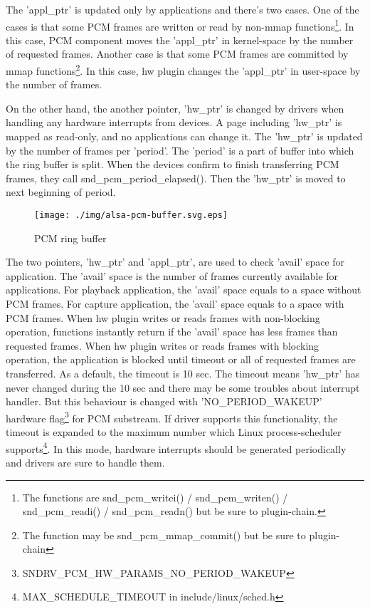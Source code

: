 \documentclass[onecolumn]{article}
\begin{document}
The 'appl\_ptr' is updated only by applications and there's two cases. One of the cases is that some PCM frames are written or read by non-mmap functions\footnote{The functions are snd\_pcm\_writei() / snd\_pcm\_writen() / snd\_pcm\_readi() / snd\_pcm\_readn() but be sure to plugin-chain.}. In this case, PCM component moves the 'appl\_ptr' in kernel-space by the number of requested frames. Another case is that some PCM frames are committed by mmap functions\footnote{The function may be snd\_pcm\_mmap\_commit() but be sure to plugin-chain}. In this case, hw plugin changes the 'appl\_ptr' in user-space by the number of frames.

On the other hand, the another pointer, 'hw\_ptr' is changed by drivers when handling any hardware interrupts from devices. A page including 'hw\_ptr' is mapped as read-only, and no applications can change it. The 'hw\_ptr' is updated by the number of frames per 'period'. The 'period' is a part of buffer into which the ring buffer is split. When the devices confirm to finish transferring PCM frames, they call snd\_pcm\_period\_elapsed(). Then the 'hw\_ptr' is moved to next beginning of period.

\begin{figure}[H]
	\centering
	\texttt{[image: ./img/alsa-pcm-buffer.svg.eps]}
	\caption{{PCM ring buffer}}
	\label{alsa-pcm-buffer}
\end{figure}

The two pointers, 'hw\_ptr' and 'appl\_ptr', are used to check 'avail' space for application. The 'avail' space is the number of frames currently available for applications. For playback application, the 'avail' space equals to a space without PCM frames. For capture application, the 'avail' space equals to a space with PCM frames. When hw plugin writes or reads frames with non-blocking operation, functions instantly return if the 'avail' space has less frames than requested frames. When hw plugin writes or reads frames with blocking operation, the application is blocked until timeout or all of requested frames are transferred. As a default, the timeout is 10 sec. The timeout means 'hw\_ptr' has never changed during the 10 sec and there may be some troubles about interrupt handler. But this behaviour is changed with 'NO\_PERIOD\_WAKEUP' hardware flag\footnote{SNDRV\_PCM\_HW\_PARAMS\_NO\_PERIOD\_WAKEUP} for PCM substream. If driver supports this functionality, the timeout is expanded to the maximum number which Linux process-scheduler supports\footnote{MAX\_SCHEDULE\_TIMEOUT in include/linux/sched.h}. In this mode, hardware interrupts should be generated periodically and drivers are sure to handle them.
\end{document}
